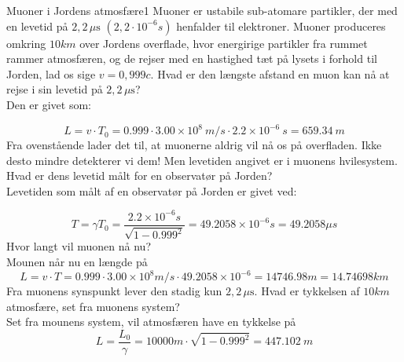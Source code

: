 \begin{opgave}{Muoner i Jordens atmosfære}{1}
	Muoner er ustabile sub-atomare partikler, der med en levetid på $2,2 \,\mu\si{\s}$ $(2,2 \cdot 10^{-6} \si{s})$ henfalder til elektroner.
	Muoner produceres omkring $10 \si{km}$ over Jordens overflade, hvor energirige partikler fra rummet rammer
	atmosfæren, og de rejser med en hastighed tæt på lysets i forhold til Jorden, lad os sige $v = 0,999c$.
	\opg Hvad er den længste afstand en muon kan nå at rejse i sin levetid på $2,2 \,\mu\si{\s}$?\\
	
	Den er givet som:
	
	$$L = v \cdot T_0 = 0.999 \cdot 3.00 \times 10^8 \ \si{m/s} \cdot 2.2 \times 10^{-6} \ \si{s} = \SI{659.34}{m}$$
	\opg Fra ovenstående lader det til, at muonerne aldrig vil nå os på overfladen. Ikke desto mindre detekterer vi
	dem! Men levetiden angivet er i muonens hvilesystem. Hvad er dens levetid målt for en observatør på
	Jorden?\\
	
	Levetiden som målt af en observatør på Jorden er givet ved:
	
	$$T=\gamma T_0=\frac{2.2 \times 10^{-6}\si{s}}{\sqrt{1-0.999^2}}=49.2058 \times 10^{-6}\si{s}=49.2058\mu\si{s} $$
	\opg Hvor langt vil muonen nå nu?\\
	
	Mounen når nu en længde på 
	$$L=v \cdot T=0.999 \cdot 3.00 \times 10^8 \si{m/s} \cdot 49.2058 \times 10^{-6} = 14746.98 \si{m} = 14.74698 \si{km}$$
	\opg Fra muonens synspunkt lever den stadig kun $2,2 \, \mu\si{\s}$. Hvad er tykkelsen af $10 \si{km}$ atmosfære, set fra
	muonens system?\\
	
	Set fra mounens system, vil atmosfæren have en tykkelse på
	$$L=\frac{L_0}{\gamma}=10000 \si{m} \cdot \sqrt{1-0.999^2} = 447.102 \ \si{m}$$
\end{opgave}

